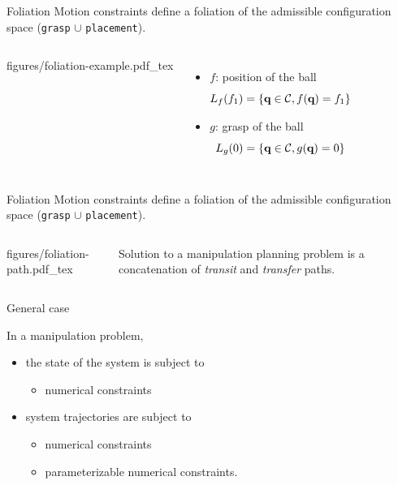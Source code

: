 \begin {frame} {Foliation}
  Motion constraints define a foliation of the admissible configuration space (\texttt{grasp} $\cup$ \texttt{placement}).
  \begin{columns}
    \centering
    \def\svgwidth {\linewidth}
                  {\tiny
                    \graphicspath{{./figures/}}
                     {figures/foliation-example.pdf_tex}
                }
    \centering
    \begin{itemize}
    \item $f$: position of the ball
      $$L_{f}(f_1) = \left\{\textbf{q}\in{\cal C}, f (\textbf{q}) = f_1 \right\}$$
    \item $g$: grasp of the ball
      $$L_{g}(0) = \left\{\textbf{q}\in{\cal C}, g (\textbf{q}) = 0 \right\}$$
    \end{itemize}
  \end {columns}

\end {frame}

%
%

\begin {frame} {Foliation}
  Motion constraints define a foliation of the admissible configuration space (\texttt{grasp} $\cup$ \texttt{placement}).
  \begin{columns}
    \centering
    \def\svgwidth {\linewidth}
                  {\tiny
                    \graphicspath{{./figures/}}
                     {figures/foliation-path.pdf_tex}
                }
    \centering
    Solution to a manipulation planning problem is a concatenation of \textit{transit} and \textit{transfer} paths.
  \end {columns}

\end {frame}

%
%

\begin {frame} {General case}

  In a manipulation problem,
  \begin{itemize}
  \item the state of the system is subject to
    \begin {itemize}
      \item numerical constraints
    \end {itemize}
    \pause
  \item system trajectories are subject to
    \begin {itemize}
    \item numerical constraints
    \item parameterizable numerical constraints.
    \end {itemize}
  \end{itemize}
\end {frame}

